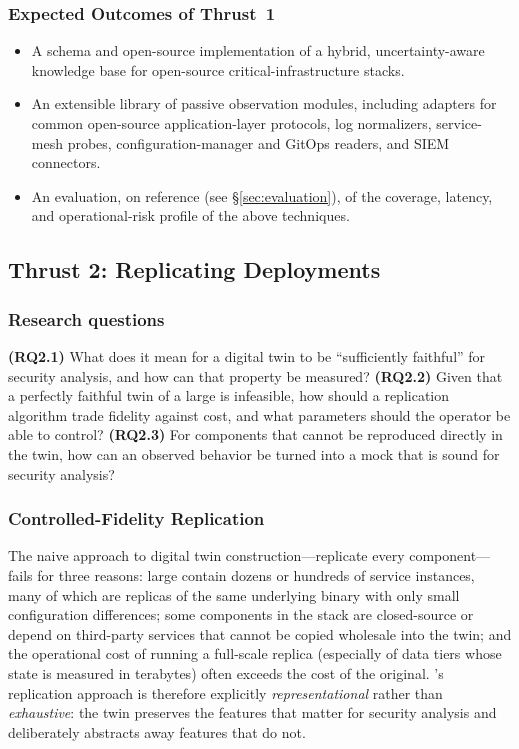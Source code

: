 \subsubsection{Expected Outcomes of Thrust~1}
\begin{itemize}[leftmargin=1.3em,itemsep=0.1em,topsep=0.2em]
  \item A schema and open-source implementation of a hybrid,
  uncertainty-aware knowledge base for open-source
  critical-infrastructure stacks.
  \item An extensible library of passive observation modules, including
  adapters for common open-source application-layer protocols, log
  normalizers, service-mesh probes, configuration-manager and GitOps
  readers, and SIEM connectors.
  \item An evaluation, on reference \CPSs (see
  \S\ref{sec:evaluation}), of the coverage, latency, and
  operational-risk profile of the above techniques.
\end{itemize}

\subsection{Thrust 2: Replicating Deployments}
\label{sec:thrust2}

\subsubsection*{Research questions}
\textbf{(RQ2.1)} What does it mean for a digital twin to be
``sufficiently faithful'' for security analysis, and how can that
property be measured?
\textbf{(RQ2.2)} Given that a perfectly faithful twin of a large \cps
is infeasible, how should a replication algorithm trade fidelity
against cost, and what parameters should the operator be able to
control?
\textbf{(RQ2.3)} For components that cannot be reproduced directly
in the twin, how can an observed behavior be turned into a mock that
is sound for security analysis?

\subsubsection{Controlled-Fidelity Replication}

The naive approach to digital twin construction---replicate every
component---fails for three reasons: large \CPSs contain dozens or
hundreds of service instances, many of which are replicas of the
same underlying binary with only small configuration differences;
some components in the stack are closed-source or depend on
third-party services that cannot be copied wholesale into the twin;
and the operational cost of running a full-scale replica (especially
of data tiers whose state is measured in terabytes) often exceeds the
cost of the original. \sysname's replication approach is therefore
explicitly \emph{representational} rather than \emph{exhaustive}: the
twin preserves the features that matter for security analysis and
deliberately abstracts away features that do not.

